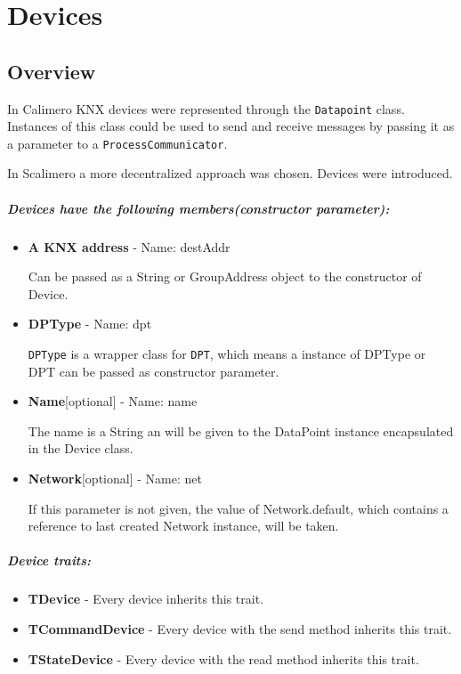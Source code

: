 \chapter{Devices}
\section{Overview}

In Calimero KNX devices were represented through the \lstinline!Datapoint! class. Instances of this class could be used to send and receive messages by passing it as a parameter to a \lstinline!ProcessCommunicator!.

In Scalimero a more decentralized approach was chosen. Devices were introduced.

\paragraph{Devices have the following members(constructor parameter):}
\begin{itemize}
  \item \textbf{A KNX address} - Name: destAddr

    Can be passed as a String or GroupAddress object to the constructor of Device.
  \item \textbf{DPType} - Name: dpt

    \lstinline!DPType! is a wrapper class for \lstinline!DPT!, which means a instance of DPType or DPT can be passed as constructor parameter.
  \item \textbf{Name}[optional] - Name: name

    The name is a String an will be given to the DataPoint instance encapsulated in the Device class.
  \item \textbf{Network}[optional] - Name: net

    If this parameter is not given, the value of Network.default, which contains a reference to last created Network instance, will be taken.
\end{itemize}

\paragraph{Device traits:}
\begin{itemize}
  \item \textbf{TDevice} - Every device inherits this trait.
  \item \textbf{TCommandDevice} - Every device with the send method inherits this trait.
  \item \textbf{TStateDevice} - Every device with the read method inherits this trait.
\end{itemize}

